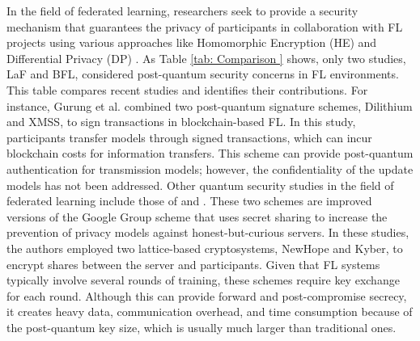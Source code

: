  In the field of federated learning, researchers seek to provide a security mechanism that guarantees the privacy of participants in collaboration with FL projects using various approaches like Homomorphic Encryption (HE) and Differential Privacy (DP) \citep{A_survey_on_security}. 
 As Table \ref{tab: Comparison } shows, only two studies, LaF \citep{Performance_Analysis} and BFL\citep{LaF}, considered post-quantum security concerns in FL environments.  
 This table compares recent studies and identifies their contributions. 
 For instance, Gurung et al. \citep{Performance_Analysis} combined two post-quantum signature schemes, Dilithium and XMSS, to sign transactions in blockchain-based FL.  
 In this study, participants transfer models through signed transactions, which can incur blockchain costs for information transfers.  
 This scheme can provide post-quantum authentication for transmission models; however, the confidentiality of the update models has not been addressed.   Other quantum security studies in the field of federated learning include those of \citep{LaF} and \citep{A_post-quantum_secure}.   
 These two schemes are improved versions of the Google Group scheme \citep{Practical_secure_aggregation} that uses secret sharing to increase the prevention of privacy models against honest-but-curious servers. 
 In these studies, the authors employed two lattice-based cryptosystems, NewHope \citep{NewHope} and Kyber, to encrypt shares between the server and participants. 
 Given that FL systems typically involve several rounds of training, these schemes require key exchange for each round.   
 Although this can provide forward and post-compromise secrecy, it creates heavy data, communication overhead, and time consumption because of the post-quantum key size, which is usually much larger than traditional ones.

